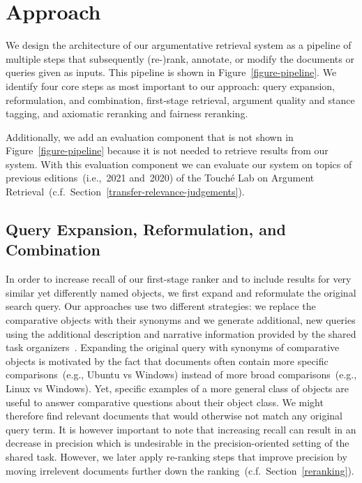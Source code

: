\section{Approach}\label{approach}



We design the architecture of our argumentative retrieval system as a pipeline of multiple steps that subsequently (re-)rank, annotate, or modify the documents or queries given as inputs. This pipeline is shown in Figure~\ref{figure-pipeline}.
We identify four core steps as most important to our approach:
\Ni query expansion, reformulation, and combination,
\Nii first-stage retrieval,
\Niii argument quality and stance tagging,
and \Niv axiomatic reranking and fairness reranking.

Additionally, we add an evaluation component that is not shown in Figure~\ref{figure-pipeline} because it is not needed to retrieve results from our system.
With this evaluation component we can evaluate our system on topics of previous editions~(i.e.,~2021 and~2020) of the Touché Lab on Argument Retrieval~(c.f.~Section~\ref{transfer-relevance-judgements}).

\subsection{Query Expansion, Reformulation, and Combination}
\label{reformulation}

In order to increase recall of our first-stage ranker and to include results for very similar yet differently named objects, we first expand and reformulate the original search query.
Our approaches use two different strategies: \Ni we replace the comparative objects with their synonyms and \Nii we generate additional, new queries using the additional description and narrative information provided by the shared task organizers~\cite{BondarenkoFKSGBPBSWPH2022}.
Expanding the original query with synonyms of comparative objects is motivated by the fact that documents often contain more specific comparisons~(e.g., Ubuntu vs Windows) instead of more broad comparisons~(e.g., Linux vs Windows).
Yet, specific examples of a more general class of objects are useful to answer comparative questions about their object class.
We might therefore find relevant documents that would otherwise not match any original query term.
It is however important to note that increasing recall can result in an decrease in precision which is undesirable in the precision-oriented setting of the shared task.
However, we later apply re-ranking steps that improve precision by moving irrelevent documents further down the ranking~(c.f.~Section~\ref{reranking}).

